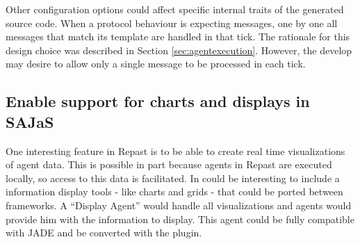 Other configuration options could affect specific internal traits of the generated source code. When a protocol behaviour is expecting messages, one by one all messages that match its template are handled in that tick. The rationale for this design choice was described in Section \ref{sec:agentexecution}. However, the develop may desire to allow only a single message to be processed in each tick.

\subsection{Enable support for charts and displays in SAJaS}
One interesting feature in Repast is to be able to create real time visualizations of agent data. This is possible in part because agents in Repast are executed locally, so access to this data is facilitated. In could be interesting to include a information display tools - like charts and grids - that could be ported between frameworks. A ``Display Agent'' would handle all visualizations and agents would provide him with the information to display. This agent could be fully compatible with JADE and be converted with the plugin.


